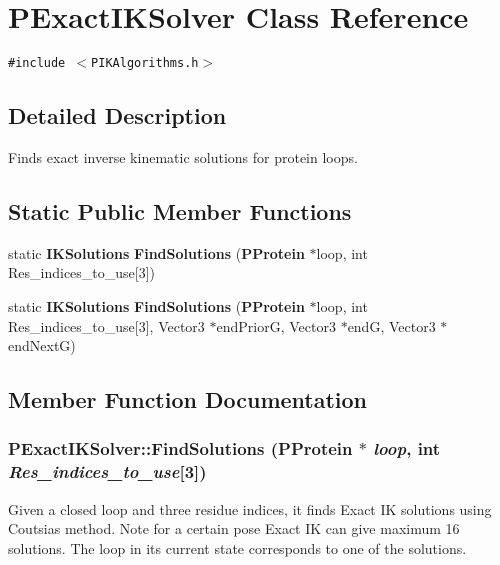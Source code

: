 \section{PExact\-IKSolver Class Reference}
\label{classPExactIKSolver}
{\tt \#include $<$PIKAlgorithms.h$>$}



\subsection{Detailed Description}
Finds exact inverse kinematic solutions for protein loops. 

\subsection*{Static Public Member Functions}
\begin{CompactItemize}
\item 
static {\bf IKSolutions} {\bf Find\-Solutions} ({\bf PProtein} $\ast$loop, int Res\_\-indices\_\-to\_\-use[3])
\item 
static {\bf IKSolutions} {\bf Find\-Solutions} ({\bf PProtein} $\ast$loop, int Res\_\-indices\_\-to\_\-use[3], Vector3 $\ast$end\-Prior\-G, Vector3 $\ast$end\-G, Vector3 $\ast$end\-Next\-G)
\end{CompactItemize}


\subsection{Member Function Documentation}
\subsubsection{ PExact\-IKSolver::Find\-Solutions ({\bf PProtein} $\ast$ {\em loop}, int {\em Res\_\-indices\_\-to\_\-use}[3])\hspace{0.3cm}{\tt  [static]}}\label{classPExactIKSolver_6d1190d7dbca9cb0ace75888ee34b522}


Given a closed loop and three residue indices, it finds Exact IK solutions using Coutsias method. Note for a certain pose Exact IK can give maximum 16 solutions. The loop in its current state corresponds to one of the solutions. 
